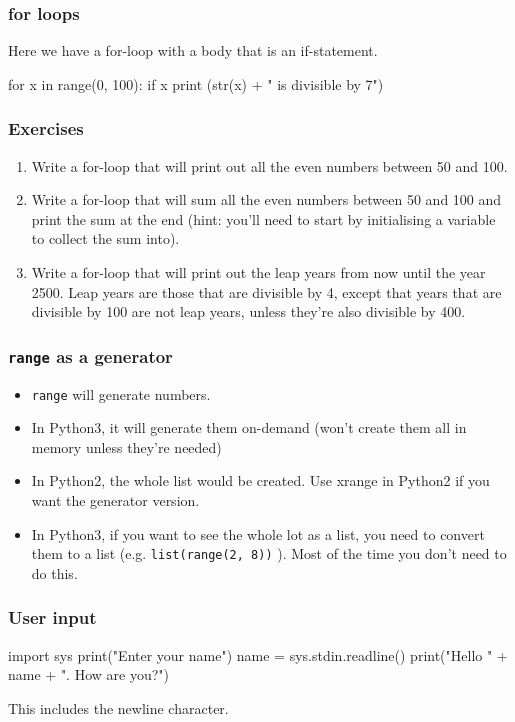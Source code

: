 \documentclass{beamer}
\begin{document}
\begin{frame}[fragile]
\frametitle{for loops}
Here we have a for-loop with a body that is an if-statement.
\bigskip
\begin{code}
for x in range(0, 100):
   if x %
   print (str(x) + " is divisible by 7")
\end{code}
\end{frame}

\begin{frame}
\frametitle{Exercises}
\begin{enumerate}
\item Write a for-loop that will print out all the even numbers
between 50 and 100.
\item Write a for-loop that will sum all the even numbers
between 50 and 100 and print the sum at the end (hint:
you'll need to start by initialising a variable to collect the
sum into).
\item Write a for-loop that will print out the leap years from
now until the year 2500. Leap years are those that are
divisible by 4, except that years that are divisible by 100
are not leap years, unless they're also divisible by 400.
\end{enumerate}
\end{frame}

\begin{frame}
\frametitle{\texttt{range} as a generator}
\begin{itemize}
\item \texttt{range} will generate numbers. 
\item In Python3, it will generate them on-demand (won't create them all
in memory unless they're needed)
\item In Python2, the whole list would be created. Use xrange in
  Python2 if you want the generator version.
\item In Python3, if you want to see the whole lot as a list, you need
  to convert them to a list (e.g. \texttt{list(range(2, 8))} ). Most of the
  time you don't need to do this.
\end{itemize} 
\end{frame}

\begin{frame}[fragile]
\frametitle{User input}
\begin{code}
import sys
print("Enter your name")
name = sys.stdin.readline()
print("Hello " + name + ". How are you?")
\end{code}
This includes the newline character.
\end{frame}
\end{document}
